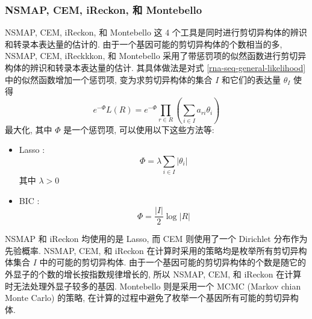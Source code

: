 \subsubsection{NSMAP, CEM, iReckon, 和 Montebello}
\label{intro-nsmap-cem-ireckon-montebllo}

NSMAP, CEM, iReckon, 和 Montebello 这 4 个工具是同时进行剪切异构体的辨识和转录本表达量的估计的. 
由于一个基因可能的剪切异构体的个数相当的多, NSMAP, CEM, iReckkkon, 和 Montebello 
采用了带惩罚项的似然函数进行剪切异构体的辨识和转录本表达量的估计. 
其具体做法是对式 \eqref{rna-seq-general-likelihood} 中的似然函数增加一个惩罚项, 
变为求剪切异构体的集合 $I$ 和它们的表达量 $\theta_I$ 使得
\begin{equation}
e^{-\Phi} L(R) = 
e^{-\Phi}\prod_{r \in R} (\sum_{i \in I} a_{ri} \theta_i)
\end{equation}
最大化, 其中 $\Phi$ 是一个惩罚项, 可以使用以下这些方法等: 
\begin{itemize}
\item Lasso \cite{tibshirani1996regression}: 
\[
\Phi = \lambda \sum_{i \in I} |\theta_i|
\]
其中 $\lambda > 0$

\item BIC \cite{BIC.Schwarz_1978}: 
\[
\Phi = \frac{|I|}{2} \log |R|
\]
\end{itemize}
NSMAP 和 iReckon 均使用的是 Lasso, 
而 CEM 则使用了一个 Dirichlet 分布作为先验概率. 
NSMAP, CEM, 和 iReckon 在计算时采用的策略均是枚举所有剪切异构体集合 $I$ 中的可能的剪切异构体. 
由于一个基因可能的剪切异构体的个数是随它的外显子的个数的增长按指数规律增长的, 
所以 NSMAP, CEM, 和 iReckon 在计算时无法处理外显子较多的基因. 
Montebello 则是采用一个 MCMC (Markov chian Monte Carlo) \cite{robert2004monte} 的策略, 
在计算的过程中避免了枚举一个基因所有可能的剪切异构体. 

